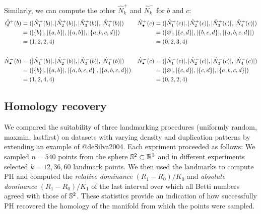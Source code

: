 \documentclass[
]{article}
\begin{document}
\begin{example}
Similarly, we can compute the other $\hat{N}_k^+$ and $\hat{N}_k^-$ for $b$ and $c$:
\begin{align*}
    \hat{Q}^+ (b) &= (\lvert \hat{N}^+_1(b)\rvert, \lvert \hat{N}^+_2(b)\rvert, \lvert \hat{N}^+_3(b)\rvert, \lvert \hat{N}^+_4(b)\rvert) &
    \hat{N}_\bullet^+ (c) &= (\lvert \hat{N}^+_1(c)\rvert, \lvert \hat{N}^+_2(c)\rvert, \lvert \hat{N}^+_3(c)\rvert, \lvert \hat{N}^+_4(c)\rvert) \\
        &= (\lvert \{b\}\rvert, \lvert \{a, b\}\rvert, \lvert \{a, b\}\rvert, \lvert \{a, b, c, d\}\rvert) &
        &= (\lvert \varnothing\rvert, \lvert \{c, d\}\rvert, \lvert \{b, c, d\}\rvert, \lvert \{a, b, c, d\}\rvert) \\
        &= (1, 2, 2, 4) &
        &= (0, 2, 3, 4) \\
        \\
    \hat{N}_\bullet^- (b) &= (\lvert \hat{N}^-_1(b)\rvert, \lvert \hat{N}^-_2(b)\rvert, \lvert \hat{N}^-_3(b)\rvert, \lvert \hat{N}^-_4(b)\rvert) &
    \hat{N}_\bullet^- (c) &= (\lvert \hat{N}^-_1(c)\rvert, \lvert \hat{N}^-_2(c)\rvert, \lvert \hat{N}^-_3(c)\rvert, \lvert \hat{N}^-_4(c)\rvert) \\
        &= (\lvert \{b\}\rvert, \lvert \{a, b\}\rvert, \lvert \{a, b, c, d\}\rvert, \lvert \{a, b, c, d\}\rvert) &
        &= (\lvert \varnothing\rvert, \lvert \{c, d\}\rvert, \lvert \{c, d\}\rvert, \lvert \{a, b, c, d\}\rvert) \\
        &= (1, 2, 4, 4) &&= (0, 2, 2, 4)
\end{align*}
\end{example}

\hypertarget{homology-recovery}{%
\subsection{Homology recovery}\label{homology-recovery}}

We compared the suitability of three landmarking procedures (uniformly
random, maxmin, lastfirst) on datasets with varying density and
duplication patterns by extending an example of @deSilva2004. Each
expriment proceeded as follows: We sampled \(n=540\) points from the
sphere \(\mathbb{S}^2\subset\mathbb{R}^3\) and in different experiments selected
\(k=12,36,60\) landmark points. We then used the landmarks to compute PH
and computed the \emph{relative dominance} \((R_1 - R_0) / K_0\) and
\emph{absolute dominance} \((R_1 - R_0) / K_1\) of the last interval
over which all Betti numbers agreed with those of \(\mathbb{S}^2\). These
statistics provide an indication of how successfully PH recovered the
homology of the manifold from which the points were sampled.
\end{document}
